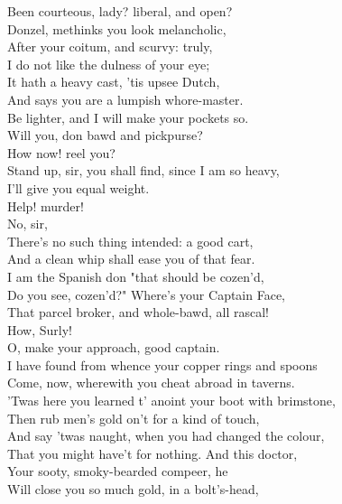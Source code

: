 \documentclass[a4paper,oneside]{memoir}
\begin{document}
\begin{drama*}
Been courteous, lady? liberal, and open?\\
Donzel, methinks you look melancholic,\\
After your coitum, and scurvy: truly,\\
I do not like the dulness of your eye;\\
It hath a heavy cast, 'tis upsee Dutch,\\
And says you are a lumpish whore-master.\\
Be lighter, and I will make your pockets so.\\
\surlyspeaks {} Will you, don bawd and pickpurse?\\
 How now! reel you?\\
Stand up, sir, you shall find, since I am so heavy,\\
I'll give you equal weight.\\
\subtlespeaks {} Help! murder!\\
\surlyspeaks {} No, sir,\\
There's no such thing intended: a good cart,\\
And a clean whip shall ease you of that fear.\\
I am the Spanish don "that should be cozen'd,\\
Do you see, cozen'd?" Where's your Captain Face,\\
That parcel broker, and whole-bawd, all rascal!\\
\facespeaks How, Surly!\\
\surlyspeaks {} O, make your approach, good captain.\\
I have found from whence your copper rings and spoons\\
Come, now, wherewith you cheat abroad in taverns.\\
'Twas here you learned t' anoint your boot with brimstone,\\
Then rub men's gold on't for a kind of touch,\\
And say 'twas naught, when you had changed the colour,\\
That you might have't for nothing. And this doctor,\\
Your sooty, smoky-bearded compeer, he\\
Will close you so much gold, in a bolt's-head,\\

\end{drama*}
\end{document}
